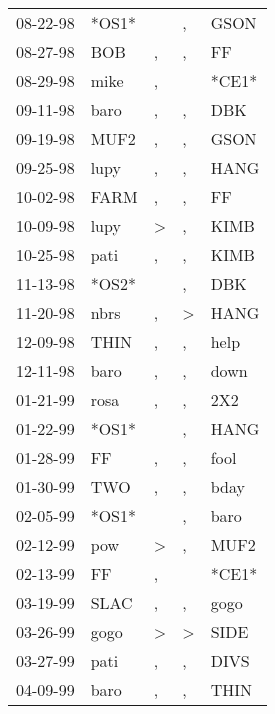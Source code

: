 \begin{supertabular}{lllll}
 08-22-98 &  *OS1* &                  &                , &   GSON \\
 08-27-98 &    BOB &                , &                , &     FF \\
 08-29-98 &   mike &                , &                  &  *CE1* \\
 09-11-98 &   baro &                , &                , &    DBK \\
 09-19-98 &   MUF2 &                , &                , &   GSON \\
 09-25-98 &   lupy &                , &                , &   HANG \\
 10-02-98 &   FARM &                , &                , &     FF \\
 10-09-98 &   lupy &     \textgreater &                , &   KIMB \\
 10-25-98 &   pati &                , &                , &   KIMB \\
 11-13-98 &  *OS2* &                  &                , &    DBK \\
 11-20-98 &   nbrs &                , &     \textgreater &   HANG \\
 12-09-98 &   THIN &                , &                , &   help \\
 12-11-98 &   baro &                , &                , &   down \\
 01-21-99 &   rosa &                , &                , &    2X2 \\
 01-22-99 &  *OS1* &                  &                , &   HANG \\
 01-28-99 &     FF &                , &                , &   fool \\
 01-30-99 &    TWO &                , &                , &   bday \\
 02-05-99 &  *OS1* &                  &                , &   baro \\
 02-12-99 &    pow &     \textgreater &                , &   MUF2 \\
 02-13-99 &     FF &                , &                  &  *CE1* \\
 03-19-99 &   SLAC &                , &                , &   gogo \\
 03-26-99 &   gogo &     \textgreater &     \textgreater &   SIDE \\
 03-27-99 &   pati &                , &                , &   DIVS \\
 04-09-99 &   baro &                , &                , &   THIN \\

\end{supertabular}
